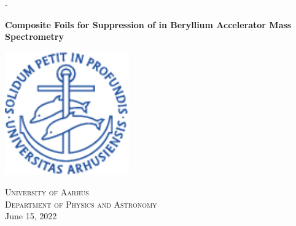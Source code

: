 \documentclass[a4paper, oneside, 12pt]{memoir}
\begin{document}
\begin{adjustwidth*}{\unitlength}{-\unitlength}
\begin{adjustwidth}{-1cm}{-1cm}   
\begin{titlingpage}
\begin{center}

{\LARGE \bfseries  Composite  Foils for Suppression of  in Beryllium Accelerator Mass Spectrometry}%
\vspace{0.1cm}
\vspace{3cm}

\includegraphics[width=0.4\textwidth]{B/segla1b (1).pdf} %
\vspace{1.5cm}

\begin{minipage}{0.4\textwidth}
\begin{flushleft} \large
{} %
\end{flushleft}
\end{minipage}

\vspace{3cm}

\begin{minipage}{0.4\textwidth}
\begin{flushleft} \large
{} %
\end{flushleft}
\end{minipage}

\vspace{1cm}

\vfill %
\textsc{University of Aarhus}\\
\textsc{Department of Physics and Astronomy}\\ %
{\large June 15, 2022}


\end{center}
\end{titlingpage}
\end{adjustwidth}
\end{adjustwidth*}
\end{document}
